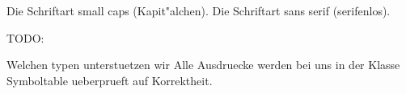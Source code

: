 \documentclass[a4paper,10pt]{article}
\begin{document}
{\sc Die Schriftart small caps (Kapit"alchen).}
{\sf Die Schriftart sans serif (serifenlos).}

\tableofcontents
\newpage

TODO:

Welchen typen unterstuetzen wir
Alle Ausdruecke werden bei uns in der Klasse Symboltable ueberprueft auf Korrektheit. 







\end{document}
